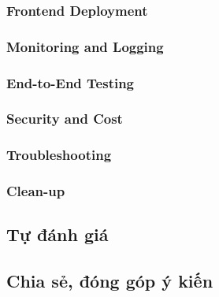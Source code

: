 \subsubsection{Frontend Deployment}


\subsubsection{Monitoring and Logging}


\subsubsection{End-to-End Testing}


\subsubsection{Security and Cost}


\subsubsection{Troubleshooting}


\subsubsection{Clean-up}


\newpage

\subsection{Tự đánh giá}



\newpage

\subsection{Chia sẻ, đóng góp ý kiến}



\newpage

